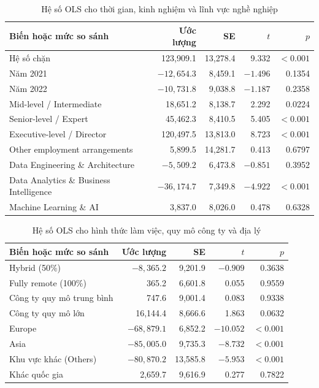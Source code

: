\begin{table}[H]
\centering
\caption{Hệ số OLS cho thời gian, kinh nghiệm và lĩnh vực nghề nghiệp}
\label{tab:nghi-ols-coef-1}
\footnotesize
\begin{tabular}{>{\raggedright\arraybackslash}p{}rrrr}
\toprule
\textbf{Biến hoặc mức so sánh} & \textbf{Ước lượng} & \textbf{SE} &
\textbf{$t$} & \textbf{$p$} \\
\midrule
Hệ số chặn & 123,909.1 & 13,278.4 & 9.332 & $<0.001$ \\
Năm 2021 & $-12,654.3$ & 8,459.1 & $-1.496$ & 0.1354 \\
Năm 2022 & $-10,731.8$ & 9,038.8 & $-1.187$ & 0.2358 \\
Mid-level / Intermediate & 18,651.2 & 8,138.7 & 2.292 & 0.0224 \\
Senior-level / Expert & 45,462.3 & 8,410.5 & 5.405 & $<0.001$ \\
Executive-level / Director & 120,497.5 & 13,813.0 & 8.723 & $<0.001$ \\
Other employment arrangements & 5,899.5 & 14,281.7 & 0.413 & 0.6797 \\
Data Engineering \& Architecture & $-5,509.2$ & 6,473.8 & $-0.851$ & 0.3952 \\
Data Analytics \& Business Intelligence & $-36,174.7$ & 7,349.8 & $-4.922$ & $<0.001$ \\
Machine Learning \& AI & 3,837.0 & 8,026.0 & 0.478 & 0.6328 \\
\bottomrule
\end{tabular}
\end{table}

\begin{table}[H]
\centering
\caption{Hệ số OLS cho hình thức làm việc, quy mô công ty và địa lý}
\label{tab:nghi-ols-coef-2}
\footnotesize
\begin{tabular}{>{\raggedright\arraybackslash}p{}rrrr}
\toprule
\textbf{Biến hoặc mức so sánh} & \textbf{Ước lượng} & \textbf{SE} &
\textbf{$t$} & \textbf{$p$} \\
\midrule
Hybrid (50\%) & $-8,365.2$ & 9,201.9 & $-0.909$ & 0.3638 \\
Fully remote (100\%) & 365.2 & 6,601.8 & 0.055 & 0.9559 \\
Công ty quy mô trung bình & 747.6 & 9,001.4 & 0.083 & 0.9338 \\
Công ty quy mô lớn & 16,144.4 & 8,666.6 & 1.863 & 0.0632 \\
Europe & $-68,879.1$ & 6,852.2 & $-10.052$ & $<0.001$ \\
Asia & $-85,005.0$ & 9,735.3 & $-8.732$ & $<0.001$ \\
Khu vực khác (Others) & $-80,870.2$ & 13,585.8 & $-5.953$ & $<0.001$ \\
Khác quốc gia & 2,659.7 & 9,616.9 & 0.277 & 0.7822 \\
\bottomrule
\end{tabular}
\end{table}


